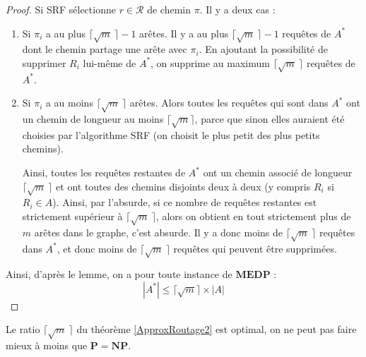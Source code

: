 \begin{proof}
Si SRF sélectionne $r \in \mathcal{R}$  de chemin $\pi$. Il y a deux cas :
\begin{enumerate}
\item Si $\pi_i$ a au plus $\lceil \sqrt{m} ~\rceil-1$ arêtes. Il y a au plus $\lceil \sqrt{m} ~\rceil-1$ requêtes de $A^*$ dont le chemin partage une arête avec $\pi_i$. En ajoutant la possibilité de supprimer $R_i$ lui-même de $A^*$, on supprime au maximum $\lceil \sqrt{m} ~\rceil$ requêtes de $A^*$.
\item Si $\pi_i$ a au moins $\lceil \sqrt{m} ~\rceil$ arêtes. Alors toutes les requêtes qui sont dans $A^*$ ont un chemin de longueur au moins $\lceil \sqrt{m} \rceil$, parce que sinon elles auraient été choisies par l'algorithme SRF (on choisit le plus petit des plus petits chemins). 

Ainsi, toutes les requêtes restantes de $A^*$ ont un chemin associé de longueur $\lceil \sqrt{m} ~\rceil$ et ont toutes des chemins disjoints deux à deux (y compris $R_i$ si $R_i \in A$). Ainsi, par l'absurde, si ce nombre de requêtes restantes est strictement supérieur à $\lceil \sqrt{m} ~\rceil$, alors on obtient en tout strictement plus de $m$ arêtes dans le graphe, c'est absurde. Il y a donc moins de $\lceil \sqrt{m} ~\rceil$ requêtes dans $A^*$, et donc moins de $\lceil \sqrt{m} ~\rceil$ requêtes qui peuvent être supprimées.
\end{enumerate}
Ainsi, d'après le lemme, on a pour toute instance de $\mathbf{MEDP}$ :
$$
|A^*| \leq \lceil \sqrt{m} \rceil \times |A|
$$
\end{proof}


\noindent Le ratio $\lceil \sqrt{m} ~\rceil$ du théorème \ref{ApproxRoutage2} est optimal, on ne peut pas faire mieux à moins que $\mathbf{P}=\mathbf{NP}$.